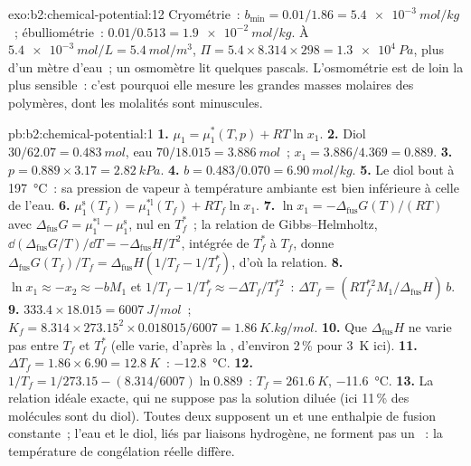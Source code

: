 \begin{solution}{exo:b2:chemical-potential:12}
Cryométrie~: $b_{\min} = 0.01/1.86 = \qty{5.4e-3}{mol/kg}$~; ébulliométrie~:
$0.01/0.513 = \qty{1.9e-2}{mol/kg}$. À $\qty{5.4e-3}{mol/L} =
\qty{5.4}{mol/m^3}$, $\Pi = 5.4 \times 8.314 \times 298 = \qty{1.3e4}{Pa}$,
plus d'un mètre d'eau~; un osmomètre lit quelques pascals. L'osmométrie est de
loin la plus sensible~: c'est pourquoi elle mesure les grandes masses molaires des
polymères, dont les molalités sont minuscules.
\end{solution}

\begin{solution}{pb:b2:chemical-potential:1}
\textbf{1.} $\mu_1 = \mu_1^*(T, p) + RT\ln x_1$.
\textbf{2.} Diol $30/62.07 = \qty{0.483}{mol}$, eau $70/18.015 =
\qty{3.886}{mol}$~; $x_1 = 3.886/4.369 = 0.889$.
\textbf{3.} $p = 0.889 \times 3.17 = \qty{2.82}{kPa}$.
\textbf{4.} $b = 0.483/0.070 = \qty{6.90}{mol/kg}$.
\textbf{5.} Le diol bout à \qty{197}{\celsius}~: sa pression de vapeur à température
ambiante est bien inférieure à celle de l'eau.
\textbf{6.} $\mu_1^{\text{s}}(T_f) = \mu_1^{*\text{l}}(T_f) + RT_f\ln x_1$.
\textbf{7.} $\ln x_1 = -\Delta_{\text{fus}}G(T)/(RT)$ avec
$\Delta_{\text{fus}}G = \mu_1^{*\text{l}} - \mu_1^{\text{s}}$, nul en $T_f^*$~;
la relation de Gibbs--Helmholtz, $\dd(\Delta_{\text{fus}}G/T)/\dd T = -\Delta_{\text{fus}}H/T^2$,
intégrée de $T_f^*$ à $T_f$, donne $\Delta_{\text{fus}}G(T_f)/T_f =
\Delta_{\text{fus}}H(1/T_f - 1/T_f^*)$, d'où la relation.
\textbf{8.} $\ln x_1 \approx -x_2 \approx -bM_1$ et $1/T_f - 1/T_f^* \approx
-\Delta T_f/T_f^{*2}$~: $\Delta T_f = (RT_f^{*2}M_1/\Delta_{\text{fus}}H)\,b$.
\textbf{9.} $333.4 \times 18.015 = \qty{6007}{J/mol}$~; $K_f = 8.314 \times
273.15^2 \times 0.018015/6007 = \qty{1.86}{K.kg/mol}$.
\textbf{10.} Que $\Delta_{\text{fus}}H$ ne varie pas entre $T_f$ et
$T_f^*$ (elle varie, d'après la , d'environ 2\,\% pour \qty{3}{K} ici).
\textbf{11.} $\Delta T_f = 1.86 \times 6.90 = \qty{12.8}{K}$~: \qty{-12.8}{\celsius}.
\textbf{12.} $1/T_f = 1/273.15 - (8.314/6007)\ln 0.889$~: $T_f = \qty{261.6}{K}$,
\qty{-11.6}{\celsius}.
\textbf{13.} La relation idéale exacte, qui ne suppose pas la solution
diluée (ici 11\,\% des molécules sont du diol). Toutes deux supposent un 
et une enthalpie de fusion constante~; l'eau et le diol, liés par liaisons hydrogène,
ne forment pas un ~: la température de congélation réelle diffère.

\end{solution}
